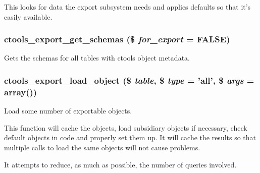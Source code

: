 This looks for data the export subsystem needs and applies defaults so that it's easily available. \hypertarget{export_8inc_aa06e4d6e162ada14df00a3e420bcd0c1}{
\subsubsection[{ctools\_\-export\_\-get\_\-schemas}]{\setlength{\rightskip}{0pt plus 5cm}ctools\_\-export\_\-get\_\-schemas (\$ {\em for\_\-export} = {\ttfamily FALSE})}}
\label{export_8inc_aa06e4d6e162ada14df00a3e420bcd0c1}
Gets the schemas for all tables with ctools object metadata. \hypertarget{export_8inc_aace7bae1172d5e4ac756fa942de06d6e}{
\subsubsection[{ctools\_\-export\_\-load\_\-object}]{\setlength{\rightskip}{0pt plus 5cm}ctools\_\-export\_\-load\_\-object (\$ {\em table}, \/  \$ {\em type} = {\ttfamily 'all'}, \/  \$ {\em args} = {\ttfamily array()})}}
\label{export_8inc_aace7bae1172d5e4ac756fa942de06d6e}
Load some number of exportable objects.

This function will cache the objects, load subsidiary objects if necessary, check default objects in code and properly set them up. It will cache the results so that multiple calls to load the same objects will not cause problems.

It attempts to reduce, as much as possible, the number of queries involved.


